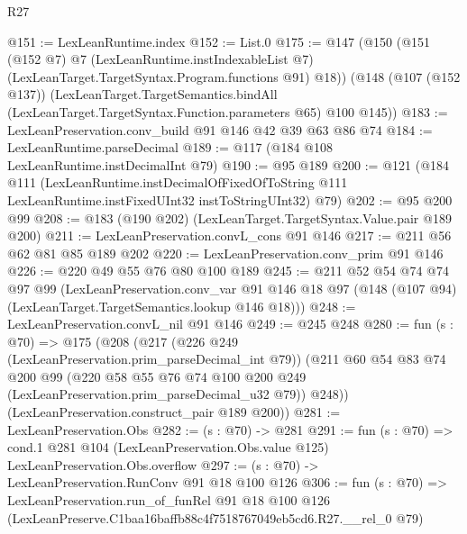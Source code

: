 \begin{lexlean}{R27}
\begin{coremodule}
@151 := LexLeanRuntime.index
@152 := List.{0}
@175 := @147
    (@150
      (@151
        (@152 @7)
        @7
        (LexLeanRuntime.instIndexableList @7)
        (LexLeanTarget.TargetSyntax.Program.functions @91)
        @18))
    (@148
      (@107 (@152 @137))
      (LexLeanTarget.TargetSemantics.bindAll
        (LexLeanTarget.TargetSyntax.Function.parameters @65)
        @100
        @145))
@183 := LexLeanPreservation.conv_build @91 @146 @42 @39 @63 @86 @74
@184 := LexLeanRuntime.parseDecimal
@189 := @117 (@184 @108 LexLeanRuntime.instDecimalInt @79)
@190 := @95 @189
@200 := @121
    (@184
      @111
      (LexLeanRuntime.instDecimalOfFixedOfToString
        @111
        LexLeanRuntime.instFixedUInt32
        instToStringUInt32)
      @79)
@202 := @95 @200 @99
@208 := @183 (@190 @202) (LexLeanTarget.TargetSyntax.Value.pair @189 @200)
@211 := LexLeanPreservation.convL_cons @91 @146
@217 := @211 @56 @62 @81 @85 @189 @202
@220 := LexLeanPreservation.conv_prim @91 @146
@226 := @220 @49 @55 @76 @80 @100 @189
@245 := @211
    @52
    @54
    @74
    @74
    @97
    @99
    (LexLeanPreservation.conv_var
      @91
      @146
      @18
      @97
      (@148 (@107 @94) (LexLeanTarget.TargetSemantics.lookup @146 @18)))
@248 := LexLeanPreservation.convL_nil @91 @146
@249 := @245 @248
@280 := fun (s : @70) =>
  @175
    (@208
      (@217
        (@226 @249 (LexLeanPreservation.prim_parseDecimal_int @79))
        (@211
          @60
          @54
          @83
          @74
          @200
          @99
          (@220 @58 @55 @76 @74 @100 @200 @249 (LexLeanPreservation.prim_parseDecimal_u32 @79))
          @248))
      (LexLeanPreservation.construct_pair @189 @200))
@281 := LexLeanPreservation.Obs
@282 := (s : @70) -> @281
@291 := fun (s : @70) =>
  cond.{1} @281 @104 (LexLeanPreservation.Obs.value @125) LexLeanPreservation.Obs.overflow
@297 := (s : @70) -> LexLeanPreservation.RunConv @91 @18 @100 @126
@306 := fun (s : @70) =>
  LexLeanPreservation.run_of_funRel
    @91
    @18
    @100
    @126
    (LexLeanPreserve.C1baa16baffb88c4f7518767049eb5cd6.R27.__rel_0 @79)
\end{coremodule}
\end{lexlean}
